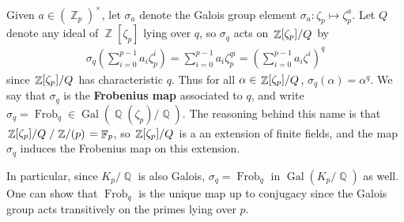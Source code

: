 \documentclass[11pt, a4paper]{memoir}
\DeclareMathOperator{\Q}{{\mathbb{Q}}}
\DeclareMathOperator{\Z}{{\mathbb{Z}}}
\DeclareMathOperator{\F}{{\mathbb{F}}}
\theoremstyle{change}
\theoremstyle{plain}
\theoremstyle{nonumberplain}
\DeclareMathOperator{\Gal}{Gal}
\newcommand{\quot}[2]{\mathchoice{\left.\raisebox{0.07em}{$#1$}\middle/\raisebox{-0.07em}{$#2$}\right.}
                                 {\left.\raisebox{0.03em}{$#1$}\middle/\raisebox{-0.03em}{$#2$}\right.}
                                 {\left.\raisebox{0.00em}{$#1$}\middle/\raisebox{-0.00em}{$#2$}\right.}
                                 {\left.\raisebox{0em}{$#1$}\middle/\raisebox{0em}{$#2$}\right.}}
\DeclareMathOperator{\Frob}{Frob}
\numberwithin{equation}{section}
\begin{document}
Given $a\in(\Z_p)^\times$, let $\sigma_a$ denote the Galois group element $\sigma_a:\zeta_p\mapsto\zeta_p^a$.
Let $Q$ denote any ideal of $\Z[\zeta_p]$ lying over $q$, so $\sigma_q$ acts on $\quot{\Z[\zeta_p]}{Q}$ by
\begin{align*}
    \sigma_q\left(\sum_{i=0}^{p-1} a_i\zeta_p^i\right)=\sum_{i=0}^{p-1}a_i\zeta_p^{qi}= \left(\sum_{i=0}^{p-1}a_i\zeta^i\right)^q
\end{align*}
since $\quot{\Z[\zeta_p]}{Q}$ has characteristic $q$.
Thus for all $\alpha\in\quot{\Z[\zeta_p]}{Q}$, $\sigma_q(\alpha)=\alpha^q$.
We say that $\sigma_q$ is the \textbf{Frobenius map} associated to $q$, and write $\sigma_q=\Frob_q\in\Gal(\Q(\zeta_p)/\Q)$.
The reasoning behind this name is that $\quot{\Z[\zeta_p]}{Q}/\quot{\Z}{(p)}=\F_p$, so $\quot{\Z[\zeta_p]}{Q}$ is a an extension of finite fields, and the map $\sigma_q$ induces the Frobenius map on this extension.

In particular, since $K_p/\Q$ is also Galois, $\sigma_q=\Frob_q$ in $\Gal(K_p/\Q)$ as well.
One can show that $\Frob_q$ is the unique map up to conjugacy since the Galois group acts transitively on the primes lying over $p$.
\end{document}
